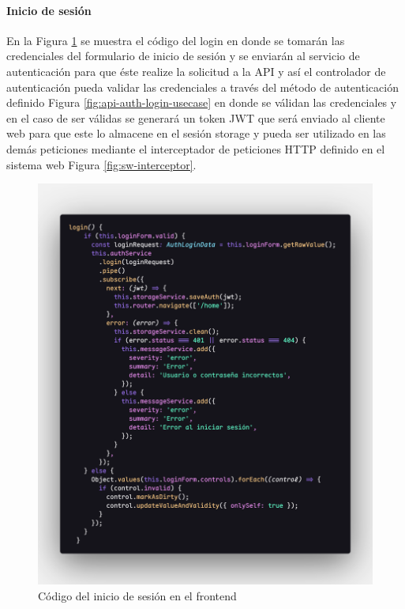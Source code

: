 \paragraph{Inicio de sesión}

En la Figura \ref{fig:sw-login-code} se muestra el código del login en donde se tomarán las credenciales del formulario de inicio de sesión y se enviarán al servicio de autenticación para que éste realize la solicitud a la API y así el controlador de autenticación pueda validar las credenciales a través del método de autenticación definido Figura \ref{fig:api-auth-login-usecase} en donde se válidan las credenciales y en el caso de ser válidas se generará un token JWT que será enviado al cliente web para que este lo almacene en el sesión storage y pueda ser utilizado en las demás peticiones mediante el interceptador de peticiones HTTP definido en el sistema web Figura \ref{fig:sw-interceptor}.

\begin{figure}[H]
    \centering
    \includegraphics[width=1\textwidth]{resources/images/sw-login-code}
    \caption{Código del inicio de sesión en el frontend}
    \label{fig:sw-login-code}
\end{figure}

